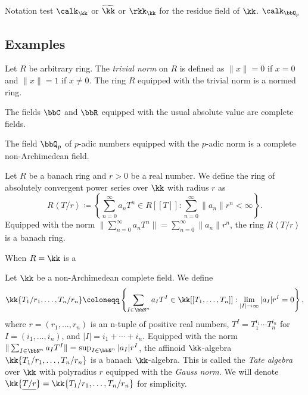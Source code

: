     Notation test \(\calk_\kk\) or \(\widetilde{\kk}\) or \(\rkk_\kk\) for the residue field of \(\kk\).
    \(\calk_{\bbQ_p}\)


\subsection{Examples}

    \begin{example}\label{eg:trivial_normed_rings}
        Let \(R\) be arbitrary ring.
        The \emph{trivial norm} on \(R\) is defined as \(\|x\| = 0\) if \(x = 0\) and \(\|x\| = 1\) if \(x \neq 0\).
        The ring \(R\) equipped with the trivial norm is a normed ring.
    \end{example}

    \begin{example}\label{eg:C_and_R_as_complete_fields}
        The fields \(\bbC\) and \(\bbR\) equipped with the usual absolute value are complete fields.
    \end{example}

    \begin{example}\label{eg:p-adic_fields_as_complete_fields}
        The field \(\bbQ_p\) of \(p\)-adic numbers equipped with the \(p\)-adic norm is a complete non-Archimedean field.
    \end{example}

    \begin{example}\label{eg:ring_of_absolutely_convergent_power_series_as_banach_rings}
        Let \(R\) be a banach ring and \(r > 0\) be a real number.
        We define the ring of absolutely convergent power series over \(\kk\) with radius \(r\) as
        \[ R\left<T/r\right> \coloneqq \left\{\sum_{n=0}^{\infty} a_n T^n \in R[[T]] : \sum_{n=0}^{\infty} \|a_n\| r^n < \infty \right\}. \]
        Equipped with the norm \(\|\sum_{n=0}^{\infty} a_n T^n\| = \sum_{n=0}^{\infty} \|a_n\| r^n\), the ring \(R\left<T/r\right>\) is a banach ring.

        When \(R = \kk\) is a 
    \end{example}

    \begin{example}\label{eg:Tate_algebras_with_Gauss_norm_as_banach_algebras}
        Let \(\kk\) be a non-Archimedean complete field.
        We define
        \[ \kk\{T_1/r_1, \ldots, T_n/r_n\} \coloneqq \left\{\sum_{I \in \bbN^n} a_I T^I \in \kk[[T_1, \ldots, T_n]] : \lim_{|I| \to \infty} |a_I| r^I = 0 \right\}, \]
        where \(r = (r_1, \ldots, r_n)\) is an n-tuple of positive real numbers, \(T^I = T_1^{i_1} \cdots T_n^{i_n}\) for \(I = (i_1, \ldots, i_n)\), and \(|I| = i_1 + \cdots + i_n\).
        Equipped with the norm \(\|\sum_{I \in \bbN^n} a_I T^I\| = \sup_{I \in \bbN^n} |a_I| r^I\), the affinoid \(\kk\)-algebra \(\kk\{T_1/r_1, \ldots, T_n/r_n\}\) is a banach \(\kk\)-algebra.
        This is called the \emph{Tate algebra} over \(\kk\) with polyradius \(r\) equipped with the \emph{Gauss norm}.
        We will denote \(\kk\{\underline{T/r}\} = \kk\{T_1/r_1, \ldots, T_n/r_n\}\) for simplicity.
    \end{example}
